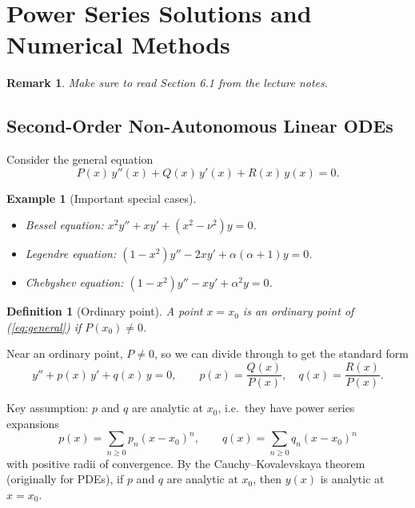 \documentclass{article}
\newtheorem{definition}{Definition}
\newtheorem*{example}{Example}
\newtheorem{remark}{Remark}
\begin{document}
\section{Power Series Solutions and Numerical Methods}

\begin{remark}
    Make sure to read Section 6.1 from the lecture notes.
\end{remark}

\subsection{Second-Order Non-Autonomous Linear ODEs}

Consider the general equation
\begin{equation}
    \label{eq:general}
    P(x)\,y''(x) + Q(x)\,y'(x) + R(x)\,y(x) = 0.
\end{equation}

\begin{example}[Important special cases]\leavevmode
    \begin{itemize}[nosep]
        \item Bessel equation: $x^2y'' + xy' + (x^2 - \nu^2)y = 0$.
        \item Legendre equation: $(1-x^2)y'' - 2xy' + \alpha(\alpha+1)y = 0$.
        \item Chebyshev equation: $(1-x^2)y'' - xy' + \alpha^2 y = 0$.
    \end{itemize}
\end{example}

\begin{definition}[Ordinary point]
    A point $x = x_0$ is an ordinary point of (\ref{eq:general}) if $P(x_0)\neq 0$.
\end{definition}

Near an ordinary point, $P\neq 0$, so we can divide through to get the standard form
\begin{equation}
    \label{eq:standard}
    y'' + p(x)\,y' + q(x)\,y = 0,\qquad p(x) = \frac{Q(x)}{P(x)},\quad q(x) = \frac{R(x)}{P(x)}.
\end{equation}

Key assumption: $p$ and $q$ are analytic at $x_0$, i.e.\ they have power series expansions
\[p(x) = \sum_{n\geq 0}p_n(x-x_0)^n,\qquad q(x) = \sum_{n\geq 0}q_n(x-x_0)^n\]
with positive radii of convergence. By the Cauchy--Kovalevskaya theorem (originally for PDEs), if $p$ and $q$ are analytic at $x_0$, then $y(x)$ is analytic at $x = x_0$.
\end{document}
